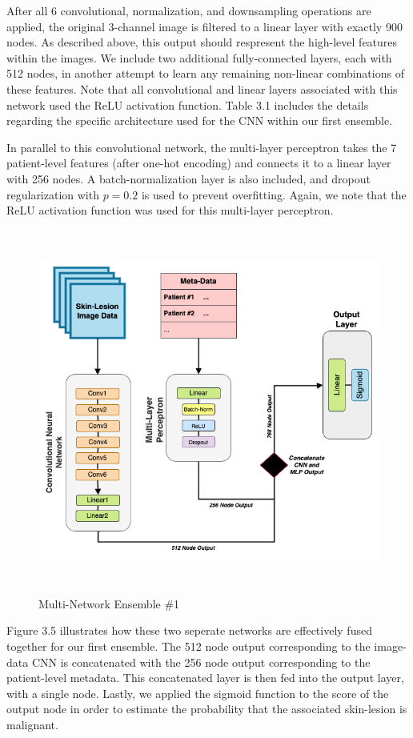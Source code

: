 \documentclass [MAS] {uclathes}
\begin{document}
After all 6 convolutional, normalization, and downsampling operations are applied, the original 3-channel image is filtered to a linear layer with exactly 900 nodes. As described above, this output should respresent the high-level features within the images. We include two additional fully-connected layers, each with 512 nodes, in another attempt to learn any remaining non-linear combinations of these features. Note that all convolutional and linear layers associated with this network used the ReLU activation function. Table 3.1 includes the details regarding the specific architecture used for the CNN within our first ensemble.

In parallel to this convolutional network, the multi-layer perceptron takes the 7 patient-level features (after one-hot encoding) and connects it to a linear layer with 256 nodes. A batch-normalization layer is also included, and dropout regularization with $p=0.2$ is used to prevent overfitting. Again, we note that the ReLU activation function was used for this multi-layer perceptron. 

\begin{figure}[h]
\centering
\includegraphics[height = 120mm, width= 140mm]{imgs/ens1_arch.png}
\caption{Multi-Network Ensemble \#1}
\label{fig:ens1_arch}
\end{figure}

Figure 3.5 illustrates how these two seperate networks are effectively fused together for our first ensemble. The 512 node output corresponding to the image-data CNN is concatenated with the 256 node output corresponding to the patient-level metadata. This concatenated layer is then fed into the output layer, with a single node. Lastly, we applied the sigmoid function to the score of the output node in order to estimate the probability that the associated skin-lesion is malignant.
\end{document}
